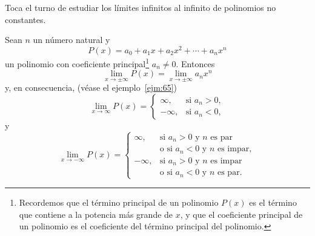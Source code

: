 \documentclass[12pt,a4paper]{book}
\begin{document}
    Toca el turno de estudiar los límites infinitos al infinito de polinomios no
    constantes.

    \begin{proposicion}\label{prop:52}
        Sean $n$ un número natural y
        \begin{equation*}
            P(x)=a_{0}+a_{1}x+a_{2}x^{2}+\cdots+a_{n}x^{n}
        \end{equation*}
        un polinomio con coeficiente principal\footnote{Recordemos que el término principal de un polinomio $P(x)$ es el término que contiene a
        la potencia más grande de $x$, y que el coeficiente principal de un polinomio es el coeficiente
        del término principal del polinomio.} $a_{n}\neq 0$. Entonces
        \begin{equation}\label{eq:4.34}
            \lim_{x\to\pm\infty}P(x)=\lim_{x\to\pm\infty}a_{n}x^{n}
        \end{equation}
        y, en consecuencia, (véase el ejemplo~\ref{ejm:65})
        \begin{equation}\label{eq:4.35}
            \lim_{x\to\infty}P(x)=\begin{cases}
                \infty, & \text{si }a_{n}>0,\\
                -\infty, & \text{si }a_{n}<0,
            \end{cases}
        \end{equation}
        y
        \begin{equation}\label{eq:4.36}
            \lim_{x\to-\infty}P(x)=\begin{cases}
                \infty, & \text{si }a_{n}>0\text{ y }n\text{ es par}\\
                & \text{o si }a_{n}<0\text{ y }n\text{ es impar},\\
                -\infty, & \text{si }a_{n}>0\text{ y }n\text{ es impar}\\
                & \text{o si }a_{n}<0\text{ y }n\text{ es par}.
            \end{cases}
        \end{equation}
    \end{proposicion}
\end{document}
